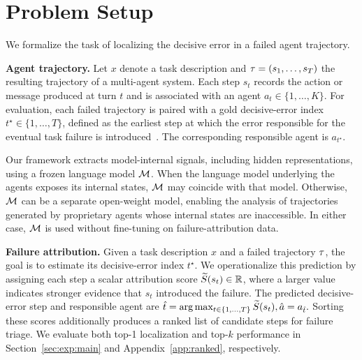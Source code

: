 


\section{Problem Setup}
\label{sec:setup}

We formalize the task of localizing the decisive error in a failed agent
trajectory.

\textbf{Agent trajectory.}
Let $x$ denote a task description and
$\tau=(s_1,\ldots,s_T)$ the resulting trajectory of a multi-agent system.
Each step $s_t$ records the action or message produced at turn $t$ and is
associated with an agent $a_t\in\{1,\ldots,K\}$.
For evaluation, each failed trajectory is paired with a gold decisive-error
index $t^\star\in\{1,\ldots,T\}$, defined as the earliest step at which the
error responsible for the eventual task failure is introduced~\citep{whoandwhen}.
The corresponding responsible agent is $a_{t^\star}$.


Our framework extracts model-internal signals, including hidden
representations, using a frozen language model
$\mathcal{M}$.
When the language model underlying the agents exposes its internal states,
$\mathcal{M}$ may coincide with that model.
Otherwise, $\mathcal{M}$ can be a separate open-weight model, enabling the
analysis of trajectories generated by proprietary agents whose internal
states are inaccessible.
In either case, $\mathcal{M}$ is used without fine-tuning on failure-attribution
data.

\textbf{Failure attribution.}
Given a task description $x$ and a failed trajectory $\tau$, the goal is to
estimate its decisive-error index $t^\star$.
We operationalize this prediction by assigning each step a scalar attribution
score $\widetilde{S}(s_t)\in\mathbb{R}$, where a larger value indicates stronger
evidence that $s_t$ introduced the failure.
The predicted decisive-error step and responsible agent are
$
    \hat{t}
    =
    \arg\max_{t\in\{1,\ldots,T\}}
    \widetilde{S}(s_t),
    \hat{a}
    =
    a_{\hat{t}}.
$
Sorting these scores additionally produces a ranked list of candidate steps
for failure triage.
We evaluate both top-1 localization and top-$k$ performance in
Section~\ref{sec:exp:main} and Appendix~\ref{app:ranked}, respectively.

